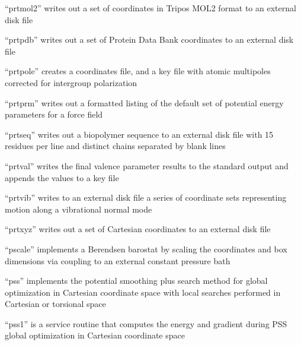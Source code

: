\documentclass[letterpaper,11pt,english]{sphinxmanual}
\begin{document}

“prtmol2” writes out a set of coordinates in Tripos MOL2
format to an external disk file


“prtpdb” writes out a set of Protein Data Bank coordinates
to an external disk file


“prtpole” creates a coordinates file, and a key file with
atomic multipoles corrected for intergroup polarization


“prtprm” writes out a formatted listing of the default
set of potential energy parameters for a force field


“prtseq” writes out a biopolymer sequence to an external
disk file with 15 residues per line and distinct chains
separated by blank lines


“prtval” writes the final valence parameter results to the
standard output and appends the values to a key file


“prtvib” writes to an external disk file a series of
coordinate sets representing motion along a vibrational
normal mode


“prtxyz” writes out a set of Cartesian coordinates
to an external disk file


“pscale” implements a Berendsen barostat by scaling the
coordinates and box dimensions via coupling to an external
constant pressure bath


“pss” implements the potential smoothing plus search method
for global optimization in Cartesian coordinate space with
local searches performed in Cartesian or torsional space


“pss1” is a service routine that computes the energy
and gradient during PSS global optimization in Cartesian
coordinate space

\end{document}
